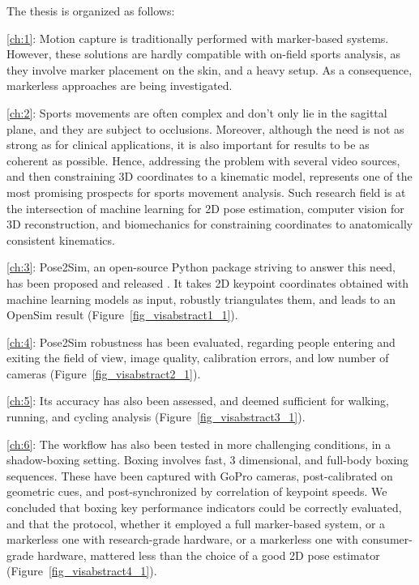 \newpage


The thesis is organized as follows:

\vspace*{0.2cm}
\noindent\autoref{ch:1}: Motion capture is traditionally performed with marker-based systems. However, these solutions are hardly compatible with on-field sports analysis, as they involve marker placement on the skin, and a heavy setup. As a consequence, markerless approaches are being investigated. 

\vspace*{0.2cm}
\noindent\autoref{ch:2}: Sports movements are often complex and don’t only lie in the sagittal plane, and they are subject to occlusions. Moreover, although the need is not as strong as for clinical applications, it is also important for results to be as coherent as possible. Hence, addressing the problem with several video sources, and then constraining 3D coordinates to a kinematic model, represents one of the most promising prospects for sports movement analysis.  Such research field is at the intersection of machine learning for 2D pose estimation, computer vision for 3D reconstruction, and biomechanics for constraining coordinates to anatomically consistent kinematics. 

\vspace*{0.2cm}
\noindent\autoref{ch:3}: Pose2Sim, an open-source Python package striving to answer this need, has been proposed and released \cite{Pagnon2022b}. It takes 2D keypoint coordinates obtained with machine learning models as input, robustly triangulates them, and leads to an OpenSim result (Figure~\ref{fig_visabstract1_1}). 

\vspace*{0.2cm}
\noindent\autoref{ch:4}: Pose2Sim robustness has been evaluated, regarding people entering and exiting the field of view, image quality, calibration errors, and low number of cameras \cite{Pagnon2021} (Figure~\ref{fig_visabstract2_1}). 

\vspace*{0.2cm}
\noindent\autoref{ch:5}: Its accuracy has also been assessed, and deemed sufficient for walking, running, and cycling analysis \cite{Pagnon2022a} (Figure~\ref{fig_visabstract3_1}). 

\vspace*{0.2cm}
\noindent\autoref{ch:6}: The workflow has also been tested in more challenging conditions, in a shadow-boxing setting. Boxing involves fast, 3 dimensional, and full-body boxing sequences. These have been captured with GoPro cameras, post-calibrated on geometric cues, and post-synchronized by correlation of keypoint speeds. We concluded that boxing key performance indicators could be correctly evaluated, and that the protocol, whether it employed a full marker-based system, or a markerless one with research-grade hardware, or a markerless one with consumer-grade hardware, mattered less than the choice of a good 2D pose estimator \cite{Pagnon2022c} (Figure~\ref{fig_visabstract4_1}).  

